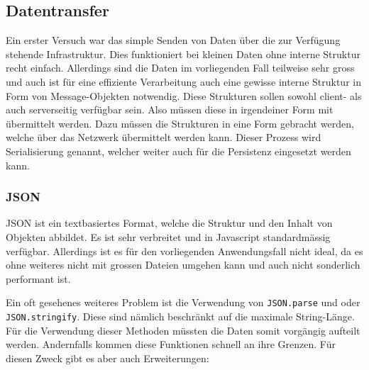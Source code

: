 



\subsection{Datentransfer}\label{l-datentransfer}



Ein erster Versuch war das simple Senden von Daten über die zur Verfügung stehende Infrastruktur. Dies funktioniert bei kleinen Daten ohne interne Struktur recht einfach. Allerdings sind die Daten im vorliegenden Fall teilweise sehr gross und auch ist für eine effiziente Verarbeitung auch eine gewisse interne Struktur in Form von Message-Objekten notwendig. Diese Strukturen sollen sowohl client- als auch serverseitig verfügbar sein. Also müssen diese in irgendeiner Form mit übermittelt werden. Dazu müssen die Strukturen in eine Form gebracht werden, welche über das Netzwerk übermittelt werden kann. Dieser Prozess wird Serialisierung genannt, welcher weiter auch für die Persistenz eingesetzt werden kann. 


\subsubsection{JSON}


JSON ist ein textbasiertes Format, welche die Struktur und den Inhalt von Objekten abbildet. Es ist sehr verbreitet und in Javascript standardmässig verfügbar. Allerdings ist es für den vorliegenden Anwendungsfall nicht ideal, da es ohne weiteres nicht mit grossen Dateien umgehen kann und auch nicht sonderlich performant ist.

Ein oft gesehenes weiteres Problem ist die Verwendung von \texttt{JSON\-.parse} und oder \texttt{JSON.stringify}. Diese sind nämlich beschränkt auf die maximale String-Länge. Für die Verwendung dieser Methoden müssten die Daten somit vorgängig aufteilt werden. Andernfalls kommen diese Funktionen schnell an ihre Grenzen. Für diesen Zweck gibt es aber auch Erweiterungen:

